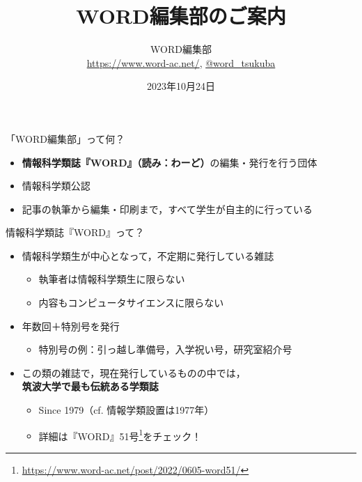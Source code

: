 \documentclass[lualatex]{beamer}
\title{\textbf{WORD編集部のご案内}}
\author{WORD編集部\\\url{https://www.word-ac.net/}, \href{https://twitter.com/word\_tsukuba}{@word\_tsukuba}}
\date{2023年10月24日}   %
\begin{document}
\maketitle
\begin{frame}[plain]{「WORD編集部」って何？}
\begin{itemize}
 \item \alert{\textbf{情報科学類誌『WORD』（読み：わーど）}}の編集・発行を行う団体
 \item 情報科学類公認
 \item 記事の執筆から編集・印刷まで，すべて学生が自主的に行っている
\end{itemize}
\end{frame}
\begin{frame}[plain]{情報科学類誌『WORD』って？}
 \begin{itemize}
  \item 情報科学類生が中心となって，不定期に発行している雑誌
  \begin{itemize}
   \item 執筆者は情報科学類生に限らない
   \item 内容もコンピュータサイエンスに限らない
  \end{itemize}
  \item 年数回＋特別号を発行
  \begin{itemize}
   \item 特別号の例：引っ越し準備号，入学祝い号，研究室紹介号
  \end{itemize}
  \item \alert{この類の雑誌で，現在発行しているものの中では，\\\textbf{筑波大学で最も伝統ある学類誌}}
  \begin{itemize}
   \item Since 1979（cf. 情報学類設置は1977年）
   \item 詳細は『WORD』51号\footnote{\url{https://www.word-ac.net/post/2022/0605-word51/}}をチェック！
  \end{itemize}
 \end{itemize}
\end{frame}
\end{document}

